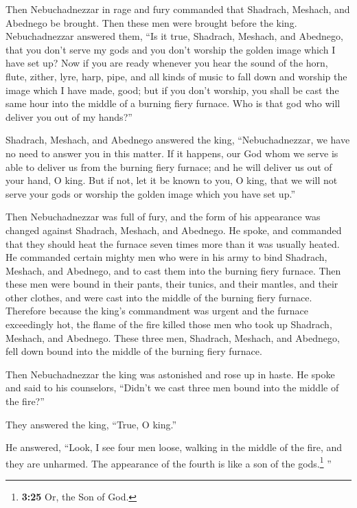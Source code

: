  Then Nebuchadnezzar in rage and fury commanded that
Shadrach, Meshach, and Abednego be brought. Then these men were brought
before the king.  Nebuchadnezzar answered them, ``Is it
true, Shadrach, Meshach, and Abednego, that you don't serve my gods and
you don't worship the golden image which I have set up? 
Now if you are ready whenever you hear the sound of the horn, flute,
zither, lyre, harp, pipe, and all kinds of music to fall down and
worship the image which I have made, good; but if you don't worship, you
shall be cast the same hour into the middle of a burning fiery furnace.
Who is that god who will deliver you out of my hands?''

 Shadrach, Meshach, and Abednego answered the king,
``Nebuchadnezzar, we have no need to answer you in this matter.
 If it happens, our God whom we serve is able to deliver
us from the burning fiery furnace; and he will deliver us out of your
hand, O king.  But if not, let it be known to you, O
king, that we will not serve your gods or worship the golden image which
you have set up.''

 Then Nebuchadnezzar was full of fury, and the form of
his appearance was changed against Shadrach, Meshach, and Abednego. He
spoke, and commanded that they should heat the furnace seven times more
than it was usually heated.  He commanded certain mighty
men who were in his army to bind Shadrach, Meshach, and Abednego, and to
cast them into the burning fiery furnace.  Then these men
were bound in their pants, their tunics, and their mantles, and their
other clothes, and were cast into the middle of the burning fiery
furnace.  Therefore because the king's commandment was
urgent and the furnace exceedingly hot, the flame of the fire killed
those men who took up Shadrach, Meshach, and Abednego. 
These three men, Shadrach, Meshach, and Abednego, fell down bound into
the middle of the burning fiery furnace.

 Then Nebuchadnezzar the king was astonished and rose up
in haste. He spoke and said to his counselors, ``Didn't we cast three
men bound into the middle of the fire?''

They answered the king, ``True, O king.''

 He answered, ``Look, I see four men loose, walking in
the middle of the fire, and they are unharmed. The appearance of the
fourth is like a son of the gods.\footnote{\textbf{3:25} Or, the Son of
  God.} ''

